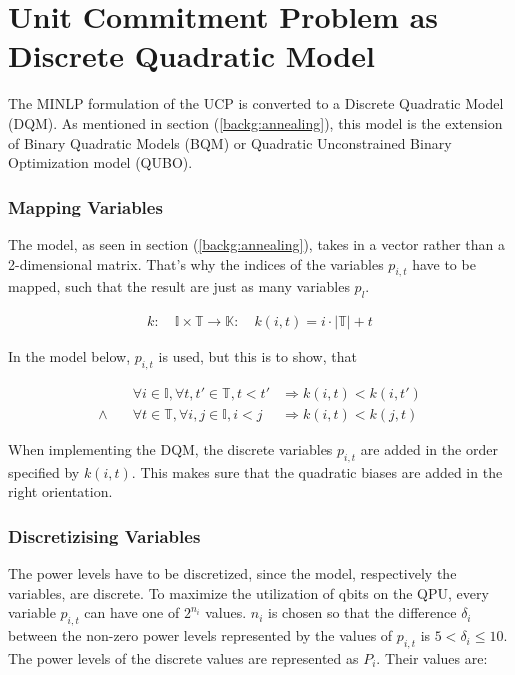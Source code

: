 \section{Unit Commitment Problem as Discrete Quadratic Model}

The MINLP formulation of the UCP is converted to a Discrete Quadratic Model (DQM).
As mentioned in section (\ref{backg:annealing}), this model is the extension
of Binary Quadratic Models (BQM) or Quadratic Unconstrained Binary Optimization model (QUBO).

\subsubsection{Mapping Variables}

The model, as seen in section (\ref{backg:annealing}), takes in a vector rather than a 2-dimensional matrix.
That's why the indices of the variables $p_{i,t}$ have to be mapped, such that the result are just as many variables $p_{l}$.

\begin{align}
  k:
  \quad
  \mathbb{I} \times \mathbb{T} \to \mathbb{K}:
  \quad
  k(i, t) = i \cdot | \mathbb{T} | + t
\end{align}

In the model below, $p_{i,t}$ is used, but this is to show, that

\begin{subequations}
\begin{align}
  &
  \forall i \in \mathbb{I}, \forall t, t' \in \mathbb{T}, t < t'
  &
  \Rightarrow k(i, t) < k(i, t')
  \\
  \land \quad
  &
  \forall t \in \mathbb{T}, \forall i, j \in \mathbb{I}, i < j
  &
  \Rightarrow k(i, t) < k(j, t)
\end{align}
\end{subequations}

When implementing the DQM, the discrete variables $p_{i, t}$ are added in the order specified by $k(i, t)$.
This makes sure that the quadratic biases are added in the right orientation.

\subsubsection{Discretizising Variables}

The power levels have to be discretized, since the model, respectively the variables, are discrete.
To maximize the utilization of qbits on the QPU, every variable $p_{i, t}$ can have one of $2^{n_i}$ values.
$n_i$ is chosen so that the difference $\delta_i$ between the non-zero power levels represented by the values of $p_{i, t}$
is $5 < \delta_i \leq 10$.
The power levels of the discrete values are represented as $P_i$.
Their values are:

